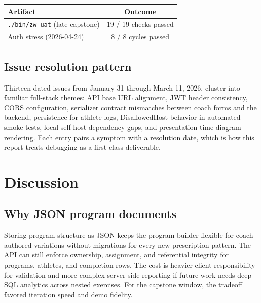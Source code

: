 \documentclass[
  letterpaper,
  DIV=11,
  numbers=noendperiod]{scrartcl}
\begin{document}
\begin{strip}
\noindent\begin{minipage}{\textwidth}
\centering
\small
\begin{tabular}{lc}
\toprule
\textbf{Artifact} & \textbf{Outcome} \\
\midrule
\texttt{./bin/zw uat} (late capstone) & 19 / 19 checks passed \\
Auth stress (2026-04-24) & 8 / 8 cycles passed \\
\bottomrule
\end{tabular}
\label{tbl-uat}
\end{minipage}
\end{strip}
\FloatBarrier

\subsection{Issue resolution pattern}\label{issue-resolution-pattern}

Thirteen dated issues from January 31 through March 11, 2026, cluster
into familiar full-stack themes: API base URL alignment, JWT header
consistency, CORS configuration, serializer contract mismatches between
coach forms and the backend, persistence for athlete logs,
DisallowedHost behavior in automated smoke tests, local self-host
dependency gaps, and presentation-time diagram rendering. Each entry
pairs a symptom with a resolution date, which is how this report treats
debugging as a first-class deliverable.

\section{Discussion}\label{discussion}

\subsection{Why JSON program
documents}\label{why-json-program-documents}

Storing program structure as JSON keeps the program builder flexible for
coach-authored variations without migrations for every new prescription
pattern. The API can still enforce ownership, assignment, and
referential integrity for programs, athletes, and completion rows. The
cost is heavier client responsibility for validation and more complex
server-side reporting if future work needs deep SQL analytics across
nested exercises. For the capstone window, the tradeoff favored
iteration speed and demo fidelity.
\end{document}
